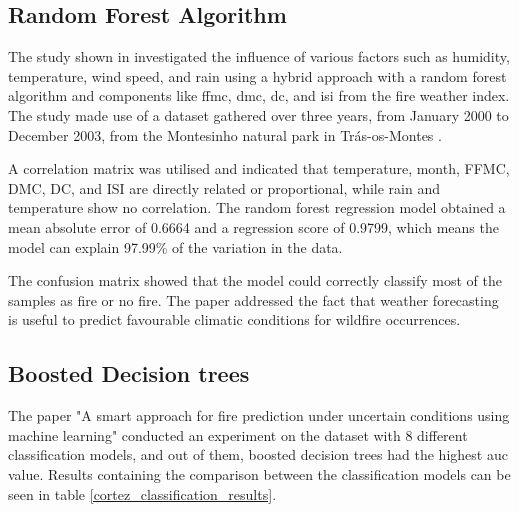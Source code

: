 \subsection{Random Forest Algorithm}
The study shown in \cite{9726029} investigated the influence of various factors such as humidity, temperature, wind speed, and rain using a hybrid approach with a random forest algorithm and components like \gls{ffmc}, \gls{dmc}, \gls{dc}, and \gls{isi} from the fire weather index.
The study made use of a dataset gathered over three years, from January 2000 to December 2003, from the Montesinho natural park in Trás-os-Montes \cite{misc_forest_fires_162}.


A correlation matrix was utilised and indicated that temperature, month, FFMC, DMC, DC, and ISI are directly related or proportional, while rain and temperature show no correlation. The random forest regression model obtained a mean absolute error of 0.6664 and a regression score of 0.9799, which means the model can explain 97.99\% of the variation in the data.

The confusion matrix showed that the model could correctly classify most of the samples as fire or no fire. The paper addressed the fact that weather forecasting is useful to predict favourable climatic conditions for wildfire occurrences.


\subsection{Boosted Decision trees}
The paper "A smart approach for fire prediction under uncertain conditions using machine learning" \cite{Sharma2020} conducted an experiment on the \cite{misc_forest_fires_162} dataset with 8 different classification models, and out of them, boosted decision trees had the highest \gls{auc} value. Results containing the comparison between the classification models can be seen in table \ref{cortez_classification_results}.

